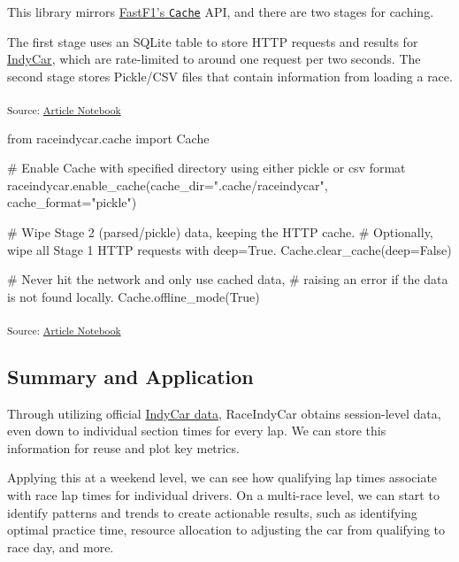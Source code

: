 \documentclass[
  10pt]{article}
\newenvironment{Shaded}{\begin{snugshade}}{\end{snugshade}}
\newcommand{\CommentTok}[1]{\textcolor[rgb]{0.37,0.37,0.37}{#1}}
\newcommand{\ImportTok}[1]{\textcolor[rgb]{0.00,0.46,0.62}{#1}}
\newcommand{\NormalTok}[1]{\textcolor[rgb]{0.00,0.23,0.31}{#1}}
\newcommand{\OperatorTok}[1]{\textcolor[rgb]{0.37,0.37,0.37}{#1}}
\newcommand{\StringTok}[1]{\textcolor[rgb]{0.13,0.47,0.30}{#1}}
\newcommand{\VariableTok}[1]{\textcolor[rgb]{0.07,0.07,0.07}{#1}}
\begin{document}
This library mirrors
\href{https://docs.fastf1.dev/api_reference/cache_and_rate_limits.html}{FastF1's
\texttt{Cache}} API, and there are two stages for caching.

The first stage uses an SQLite table to store HTTP requests and results
for \href{https://www.indycar.com/}{IndyCar}, which are rate-limited to
around one request per two seconds. The second stage stores Pickle/CSV
files that contain information from loading a race.

\textsubscript{Source:
\href{https://ArchithSharma.github.io/raceindycar_manuscript/index.qmd.html}{Article
Notebook}}

\begin{Shaded}
\begin{Highlighting}[]
\ImportTok{from}\NormalTok{ raceindycar.cache }\ImportTok{import}\NormalTok{ Cache}

\CommentTok{\# Enable Cache with specified directory using either pickle or csv format}
\NormalTok{raceindycar.enable\_cache(cache\_dir}\OperatorTok{=}\StringTok{".cache/raceindycar"}\NormalTok{, cache\_format}\OperatorTok{=}\StringTok{"pickle"}\NormalTok{)}

\CommentTok{\# Wipe Stage 2 (parsed/pickle) data, keeping the HTTP cache.}
\CommentTok{\# Optionally, wipe all Stage 1 HTTP requests with deep=True.}
\NormalTok{Cache.clear\_cache(deep}\OperatorTok{=}\VariableTok{False}\NormalTok{)}

\CommentTok{\# Never hit the network and only use cached data,}
\CommentTok{\# raising an error if the data is not found locally.}
\NormalTok{Cache.offline\_mode(}\VariableTok{True}\NormalTok{)}
\end{Highlighting}
\end{Shaded}

\textsubscript{Source:
\href{https://ArchithSharma.github.io/raceindycar_manuscript/index.qmd.html}{Article
Notebook}}

\subsection{Summary and Application}\label{summary-and-application}

Through utilizing official \href{https://www.indycar.com/}{IndyCar
data}, RaceIndyCar obtains session-level data, even down to individual
section times for every lap. We can store this information for reuse and
plot key metrics.

Applying this at a weekend level, we can see how qualifying lap times
associate with race lap times for individual drivers. On a multi-race
level, we can start to identify patterns and trends to create actionable
results, such as identifying optimal practice time, resource allocation
to adjusting the car from qualifying to race day, and more.
\end{document}
